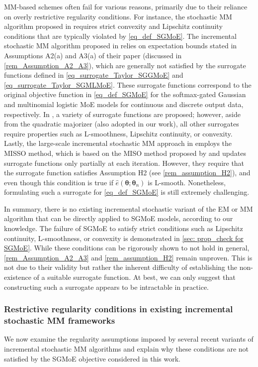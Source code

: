 \documentclass{article}
\def\vtheta{{\bm{\theta}}}
\begin{document}
MM-based schemes often fail for various reasons, primarily due to their reliance on overly restrictive regularity conditions. For instance, the stochastic MM algorithm proposed in \cite{mairal2013stochastic} requires strict convexity and Lipschitz continuity conditions that are typically violated by \cref{eq_def_SGMoE}. The incremental stochastic MM algorithm proposed in \cite{fort_sequential_2024} relies on expectation bounds stated in Assumptions A2(a) and A3(a) of their paper (discussed in \cref{rem_Assumption_A2_A3}), which are generally not satisfied by the surrogate functions defined in \cref{eq_surrogate_Taylor_SGGMoE} and \cref{eq_surrogate_Taylor_SGMLMoE}. These surrogate functions correspond to the original objective function in \cref{eq_def_SGMoE} for the softmax-gated Gaussian and multinomial logistic MoE models for continuous and discrete output data, respectively. In \cite{mairal_incremental_2015}, a variety of surrogate functions are proposed; however, aside from the quadratic majorizer (also adopted in our work), all other surrogates require properties such as L-smoothness, Lipschitz continuity, or convexity. Lastly, the large-scale incremental stochastic MM approach in \cite{karimi_minimization_2022} employs the MISSO method, which is based on the MISO method proposed by \cite{mairal_incremental_2015} and updates surrogate functions only partially at each iteration. However, they require that the surrogate function satisfies Assumption H2 (see \cref{rem_assumption_H2}), and even though this condition is true if $\hat{e}\left(\vtheta; \vtheta_n \right)$ is L-smooth. Nonetheless, formulating such a surrogate for \cref{eq_def_SGMoE} is still extremely challenging.

In summary, there is no existing incremental stochastic variant of the EM or MM algorithm that can be directly applied to SGMoE models, according to our knowledge. The failure of SGMoE to satisfy strict conditions such as Lipschitz continuity, L-smoothness, or convexity is demonstrated in \cref{sec: prop_check for SGMoE}. While these conditions can be rigorously shown to not hold in general, \cref{rem_Assumption_A2_A3} and \cref{rem_assumption_H2} remain unproven.
This is not due to their validity but rather the inherent difficulty of establishing the non-existence of a suitable surrogate function. At best, we can only suggest that constructing such a surrogate appears to be intractable in practice.
\subsubsection{Restrictive regularity conditions in existing incremental stochastic MM frameworks}
We now examine the regularity assumptions imposed by several recent variants of incremental
stochastic MM algorithms and explain why these conditions are not satisfied by the SGMoE
objective considered in this work.
\end{document}
